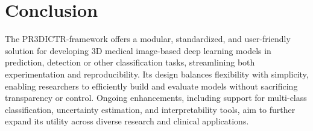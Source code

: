 \documentclass[11pt]{article}
\begin{document}
\section{Conclusion}

The PR3DICTR-framework offers a modular, standardized, and user-friendly solution for developing 3D medical image-based deep learning models in prediction, detection or other classification tasks, streamlining both experimentation and reproducibility. Its design balances flexibility with simplicity, enabling researchers to efficiently build and evaluate models without sacrificing transparency or control. Ongoing enhancements, including support for multi-class classification, uncertainty estimation, and interpretability tools, aim to further expand its utility across diverse research and clinical applications.




% 
% 
% 




% 
% 
\end{document}
